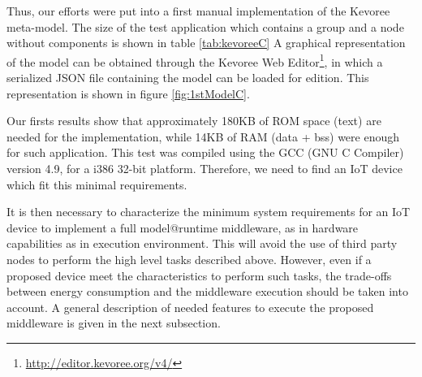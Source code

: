 Thus, our efforts were put into a first manual implementation of the Kevoree meta-model.
The size of the test application which contains a group and a node without components is shown in table \ref{tab:kevoreeC}
A graphical representation of the model can be obtained through the Kevoree Web Editor\footnote{\url{http://editor.kevoree.org/v4/}}, in which a serialized JSON file containing the model can be loaded for edition.
This representation is shown in figure \ref{fig:1stModelC}.

Our firsts results show that approximately 180KB of ROM space (text) are needed for the implementation, while 14KB of RAM (data + bss) were enough for such application.
This test was compiled using the GCC (GNU C Compiler) version 4.9, for a i386 32-bit platform.
Therefore, we need to find an IoT device which fit this minimal requirements.

It is then necessary to characterize the minimum system requirements for an IoT device to implement a full model@runtime middleware, as in hardware capabilities as in execution environment.
This will avoid the use of third party nodes to perform the high level tasks described above.
However, even if a proposed device meet the characteristics to perform such tasks, the trade-offs between energy consumption and the middleware execution should be taken into account.
A general description of needed features to execute the proposed middleware is given in the next subsection.

